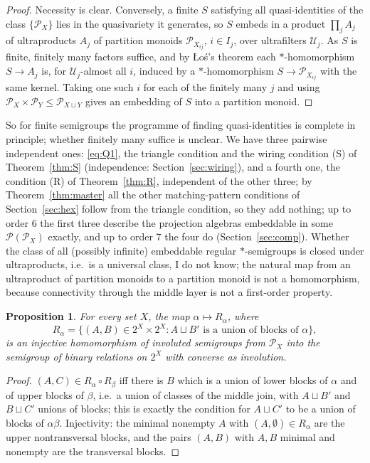 \documentclass[11pt]{amsart}
\newtheorem{proposition}[theorem]{Proposition}
\theoremstyle{definition}
\renewcommand{\P}{\mathcal{P}}
\begin{document}
\begin{proof}
Necessity is clear. Conversely, a finite $S$ satisfying all quasi-identities of the class $\{\P_X\}$ lies in the quasivariety it generates, so $S$ embeds in a product $\prod_j A_j$ of ultraproducts $A_j$ of partition monoids $\P_{X_{ij}}$, $i\in I_j$, over ultrafilters $\mathcal U_j$. As $S$ is finite, finitely many factors suffice, and by \L o\'s's theorem each $*$-homomorphism $S\to A_j$ is, for $\mathcal U_j$-almost all $i$, induced by a $*$-homomorphism $S\to\P_{X_{ij}}$ with the same kernel. Taking one such $i$ for each of the finitely many $j$ and using $\P_X\times\P_Y\le\P_{X\sqcup Y}$ gives an embedding of $S$ into a partition monoid.
\end{proof}

So for finite semigroups the programme of finding quasi-identities is complete in principle; whether finitely many suffice is unclear. We have three pairwise independent ones: \eqref{eq:Q1}, the triangle condition and the wiring condition (S) of Theorem~\ref{thm:S} (independence: Section~\ref{sec:wiring}), and a fourth one, the condition (R) of Theorem~\ref{thm:R}, independent of the other three; by Theorem~\ref{thm:master} all the other matching-pattern conditions of Section~\ref{sec:hex} follow from the triangle condition, so they add nothing; up to order $6$ the first three describe the projection algebras embeddable in some $\P(\P_X)$ exactly, and up to order $7$ the four do (Section~\ref{sec:comp}). Whether the class of all (possibly infinite) embeddable regular $*$-semigroups is closed under ultraproducts, i.e.\ is a universal class, I do not know; the natural map from an ultraproduct of partition monoids to a partition monoid is not a homomorphism, because connectivity through the middle layer is not a first-order property.

\begin{proposition}\label{prop:relations}
For every set $X$, the map $\alpha\mapsto R_\alpha$, where
\[
R_\alpha=\{(A,B)\in 2^X\times2^X: A\sqcup B'\text{ is a union of blocks of }\alpha\},
\]
is an injective homomorphism of involuted semigroups from $\P_X$ into the semigroup of binary relations on $2^X$ with converse as involution.
\end{proposition}

\begin{proof}
$(A,C)\in R_\alpha\circ R_\beta$ iff there is $B$ which is a union of lower blocks of $\alpha$ and of upper blocks of $\beta$, i.e.\ a union of classes of the middle join, with $A\sqcup B'$ and $B\sqcup C'$ unions of blocks; this is exactly the condition for $A\sqcup C'$ to be a union of blocks of $\alpha\beta$. Injectivity: the minimal nonempty $A$ with $(A,\emptyset)\in R_\alpha$ are the upper nontransversal blocks, and the pairs $(A,B)$ with $A,B$ minimal and nonempty are the transversal blocks.
\end{proof}
\end{document}
